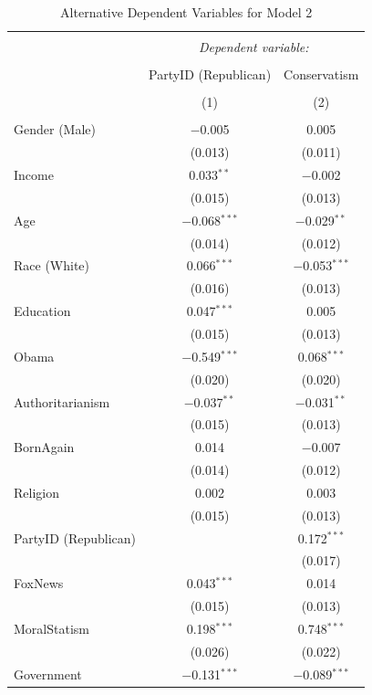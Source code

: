 \documentclass[12pt,]{article}
\begin{document}
\begin{table}[!htbp] \centering 
  \caption{Alternative Dependent Variables for Model 2} 
  \label{} 
\footnotesize 
\begin{tabular}{@{\extracolsep{5pt}}lcc} 
\\[-1.8ex]\hline 
\hline \\[-1.8ex] 
 & \multicolumn{2}{c}{\textit{Dependent variable:}} \\ 
\cline{2-3} 
\\[-1.8ex] & PartyID (Republican) & Conservatism \\ 
\\[-1.8ex] & (1) & (2)\\ 
\hline \\[-1.8ex] 
 Gender (Male) & $-$0.005 & 0.005 \\ 
  & (0.013) & (0.011) \\ 
  Income & 0.033$^{**}$ & $-$0.002 \\ 
  & (0.015) & (0.013) \\ 
  Age & $-$0.068$^{***}$ & $-$0.029$^{**}$ \\ 
  & (0.014) & (0.012) \\ 
  Race (White) & 0.066$^{***}$ & $-$0.053$^{***}$ \\ 
  & (0.016) & (0.013) \\ 
  Education & 0.047$^{***}$ & 0.005 \\ 
  & (0.015) & (0.013) \\ 
  Obama & $-$0.549$^{***}$ & 0.068$^{***}$ \\ 
  & (0.020) & (0.020) \\ 
  Authoritarianism & $-$0.037$^{**}$ & $-$0.031$^{**}$ \\ 
  & (0.015) & (0.013) \\ 
  BornAgain & 0.014 & $-$0.007 \\ 
  & (0.014) & (0.012) \\ 
  Religion & 0.002 & 0.003 \\ 
  & (0.015) & (0.013) \\ 
  PartyID (Republican) &  & 0.172$^{***}$ \\ 
  &  & (0.017) \\ 
  FoxNews & 0.043$^{***}$ & 0.014 \\ 
  & (0.015) & (0.013) \\ 
  MoralStatism & 0.198$^{***}$ & 0.748$^{***}$ \\ 
  & (0.026) & (0.022) \\ 
  Government & $-$0.131$^{***}$ & $-$0.089$^{***}$ \\ 

\end{tabular}
\end{table}
\end{document}
